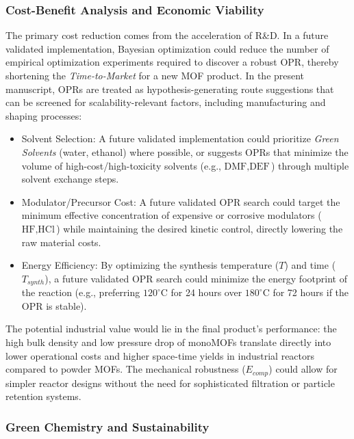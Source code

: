\documentclass[12pt,a4paper]{article}
\begin{document}
\subsubsection{Cost-Benefit Analysis and Economic Viability}

The primary cost reduction comes from the acceleration of R\&D. In a future validated implementation, Bayesian optimization could reduce the number of empirical optimization experiments required to discover a robust OPR, thereby shortening the \textit{Time-to-Market} for a new MOF product. In the present manuscript, OPRs are treated as hypothesis-generating route suggestions that can be screened for scalability-relevant factors, including manufacturing and shaping processes:\cite{ref40}
\begin{itemize}
    \item Solvent Selection: A future validated implementation could prioritize \textit{Green Solvents} (water, ethanol) where possible, or suggests OPRs that minimize the volume of high-cost/high-toxicity solvents (e.g., $\text{DMF}, \text{DEF}$) through multiple solvent exchange steps.
    \item Modulator/Precursor Cost: A future validated OPR search could target the minimum effective concentration of expensive or corrosive modulators ($\text{HF}, \text{HCl}$) while maintaining the desired kinetic control, directly lowering the raw material costs.
    \item Energy Efficiency: By optimizing the synthesis temperature ($T$) and time ($T_{synth}$), a future validated OPR search could minimize the energy footprint of the reaction (e.g., preferring $120^\circ \text{C}$ for 24 hours over $180^\circ \text{C}$ for 72 hours if the OPR is stable).
\end{itemize}
The potential industrial value would lie in the final product's performance: the high bulk density and low pressure drop of monoMOFs translate directly into lower operational costs and higher space-time yields in industrial reactors compared to powder MOFs. The mechanical robustness ($E_{comp}$) could allow for simpler reactor designs without the need for sophisticated filtration or particle retention systems.

\subsubsection{Green Chemistry and Sustainability}
\end{document}
